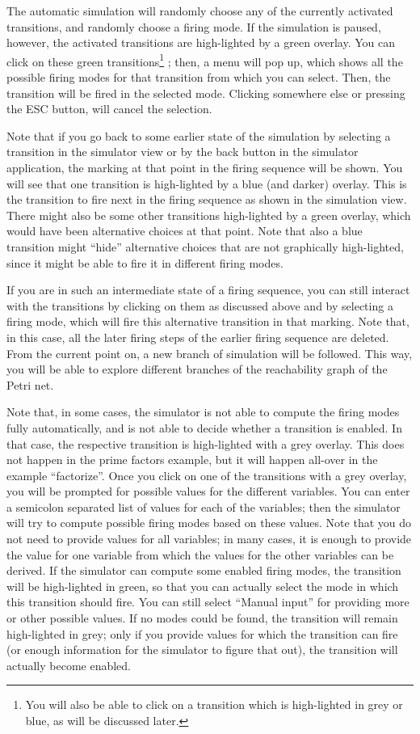 The automatic simulation will randomly choose any of the currently activated
transitions, and randomly choose a firing mode. If the simulation is paused,
however, the activated transitions are high-lighted by a green overlay. You
can click on these green transitions\footnote
  {You will also be able to click on a transition which is high-lighted in grey
  or blue, as will be discussed later.}%
; then, a menu will pop up, which shows all the possible firing modes for
that transition from which you can select. Then, the transition will be
fired in the selected mode. Clicking somewhere else or pressing the ESC
button, will cancel the selection.

Note that if you go back to some earlier state of the simulation by
selecting a transition in the simulator view or by the back button in
the simulator application, the marking at that point in the firing sequence
will be shown. You will see that one transition is high-lighted by a
blue (and darker) overlay. This is the transition to fire next in the
firing sequence as shown in the simulation view. There might also be
some other transitions high-lighted by a green overlay, which would
have been alternative choices at that point. Note that also a blue
transition might ``hide'' alternative choices that are not graphically
high-lighted, since it might be able to fire it in different firing modes.

If you are in such an intermediate state of a firing sequence, you can
still interact with the transitions by clicking on them as discussed
above and by selecting a firing mode, which will fire this alternative
transition in that marking. Note that, in this case, all the later firing steps
of the earlier firing sequence are deleted.
From the current point on, a new branch of simulation will be followed.
This way, you will be able to explore different branches of the reachability
graph of the Petri net.

Note that, in some cases, the simulator is not able to compute the firing modes
fully automatically, and is not able to decide whether a transition is enabled.
In that case, the respective transition is high-lighted with a grey overlay.
This does not happen in the prime factors example, but it will happen all-over
in the example ``factorize''. Once you click on one of the transitions with a
grey overlay, you will be prompted for possible values for the different
variables. You can enter a semicolon separated list of values for each of the
variables; then the simulator will try to compute possible firing modes based on
these values.  Note that you do not need to provide values for all variables; in
many cases, it is enough to provide the value for one variable from which the
values for the other variables can be derived.  If the simulator can compute
some enabled firing modes, the transition will be high-lighted in green, so that you can
actually select the mode in which this transition should fire. You can still select
``Manual input'' for providing more or other possible values.
If no modes could be found, the transition will remain high-lighted in grey;
only if you provide values for which the transition can fire (or enough
information for the simulator to figure that out), the transition will actually
become enabled.

